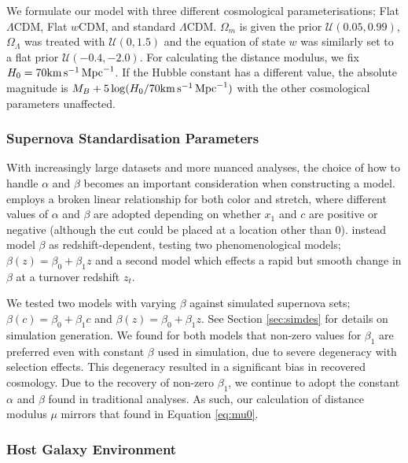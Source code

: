 \documentclass[a4paper,fleqn,usenatbib,manuscript]{emulateapj}
\newcommand{\kmsmpc}{{\rm km}\,{\rm s}^{-1}\,{\rm Mpc}^{-1}}
\newcommand{\rubin}{\citetalias{Rubin2015}}
\begin{document}
We formulate our model with three different cosmological parameterisations; Flat $\Lambda$CDM, Flat $w$CDM, and standard $\Lambda$CDM. $\Omega_m$ is given the prior $\mathcal{U}(0.05, 0.99)$, $\Omega_\Lambda$ was treated with $\mathcal{U}(0, 1.5)$ and the equation of state $w$ was similarly set to a flat prior $\mathcal{U}(-0.4, -2.0)$. For calculating the distance modulus, we fix $H_0 = 70 \kmsmpc $. If the Hubble constant has a different value, the absolute magnitude is $M_B + 5\log(H_0/70 \kmsmpc )$ with the other cosmological parameters unaffected.

\subsubsection{Supernova Standardisation Parameters}

With increasingly large datasets and more nuanced analyses, the choice of how to handle $\alpha$ and $\beta$ becomes an important consideration when constructing a model. {\rubin} employs a broken linear relationship for both color and stretch, where different values of $\alpha$ and $\beta$ are adopted depending on whether $x_1$ and $c$ are positive or negative (although the cut could be placed at a location other than 0). \citet{Shariff2016} instead model $\beta$ as redshift-dependent, testing two phenomenological models; $\beta(z) = \beta_0 + \beta_1 z$ and a second model which effects a rapid but smooth change in $\beta$ at a turnover redshift $z_t$.

We tested two models with varying $\beta$ against simulated supernova sets; $\beta(c) = \beta_0 + \beta_1 c$ and $\beta(z) = \beta_0 + \beta_1 z$. See Section \ref{sec:simdes} for details on simulation generation. We found for both models that non-zero values for $\beta_1$ are preferred even with constant $\beta$ used in simulation, due to severe degeneracy with selection effects. This degeneracy resulted in a significant bias in recovered cosmology. Due to the recovery of non-zero $\beta_1$, we continue to adopt the constant $\alpha$ and $\beta$ found in traditional analyses. As such, our calculation of distance modulus $\mu$ mirrors that found in Equation \eqref{eq:mu0}.

\subsubsection{Host Galaxy Environment}
\label{sec:hostgal}
\end{document}
